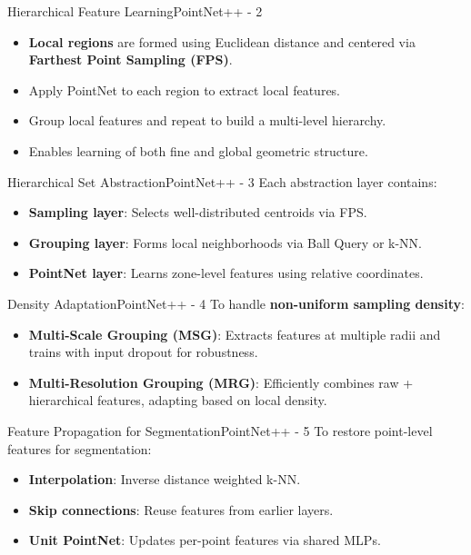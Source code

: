 \documentclass{beamer}
\begin{document}
		\begin{frame}{Hierarchical Feature Learning}{PointNet++ - 2}
			\begin{itemize}
				\item \textbf{Local regions} are formed using Euclidean distance and centered via \textbf{Farthest Point Sampling (FPS)}.
				\item Apply PointNet to each region to extract local features.
				\item Group local features and repeat to build a multi-level hierarchy.
				\item Enables learning of both fine and global geometric structure.
			\end{itemize}
		\end{frame}

		
		\begin{frame}{Hierarchical Set Abstraction}{PointNet++ - 3}
			Each abstraction layer contains:
			\begin{itemize}
				\item \textbf{Sampling layer}: Selects well-distributed centroids via FPS.
				\item \textbf{Grouping layer}: Forms local neighborhoods via Ball Query or k-NN.
				\item \textbf{PointNet layer}: Learns zone-level features using relative coordinates.
			\end{itemize}
		\end{frame}

		\begin{frame}{Density Adaptation}{PointNet++ - 4}
			To handle \textbf{non-uniform sampling density}:
			\begin{itemize}
				\item \textbf{Multi-Scale Grouping (MSG)}: Extracts features at multiple radii and trains with input dropout for robustness.
				\item \textbf{Multi-Resolution Grouping (MRG)}: Efficiently combines raw + hierarchical features, adapting based on local density.
			\end{itemize}
		\end{frame}

		\begin{frame}{Feature Propagation for Segmentation}{PointNet++ - 5}
			To restore point-level features for segmentation:
			\begin{itemize}
				\item \textbf{Interpolation}: Inverse distance weighted k-NN.
				\item \textbf{Skip connections}: Reuse features from earlier layers.
				\item \textbf{Unit PointNet}: Updates per-point features via shared MLPs.
			\end{itemize}
		\end{frame}
\end{document}
